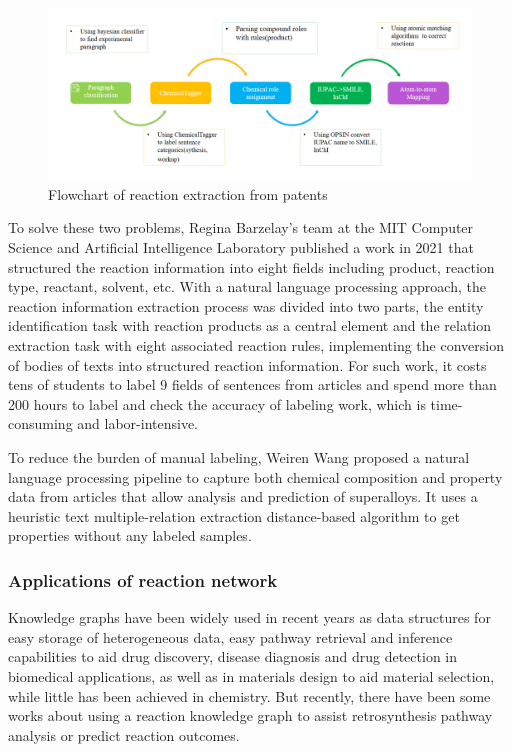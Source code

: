 \documentclass[%
 aip,
 jmp,%
 amsmath,amssymb,
 reprint,%
]{revtex4-2}
\begin{document}
\begin{figure}[htbp]
 \centering
 \includegraphics[width=1\textwidth]{figure/5.png}
 \caption{ Flowchart of reaction extraction from patents }
 \label{ Fig.5 }
\end{figure}

To solve these two problems, Regina Barzelay's team at the MIT Computer Science and Artificial Intelligence Laboratory published a work in 2021 that structured the reaction information into eight fields including product, reaction type, reactant, solvent, etc. With a natural language processing approach, the reaction information extraction process was divided into two parts, the entity identification task with reaction products as a central element and the relation extraction task with eight associated reaction rules, implementing the conversion of bodies of texts into structured reaction information\cite{guo2021automated}. For such work, it costs tens of students to label 9 fields of sentences from articles and spend more than 200 hours to label and check the accuracy of labeling work, which is time-consuming and labor-intensive.

To reduce the burden of manual labeling, Weiren Wang proposed a natural language processing pipeline to capture both chemical composition and property data from articles that allow analysis and prediction of superalloys. It uses a heuristic text multiple-relation extraction distance-based algorithm to get properties without any labeled samples\cite{wang2022automated}.

\subsubsection{Applications of reaction network}
Knowledge graphs have been widely used in recent years as data structures for easy storage of heterogeneous data, easy pathway retrieval and inference capabilities to aid drug discovery\cite{zeng2022toward}, disease diagnosis\cite{chai2020diagnosis} and drug detection in biomedical applications\cite{wang2021drug}, as well as in materials design to aid material selection\cite{nie2022automating}, while little has been achieved in chemistry. But recently, there have been some works about using a reaction knowledge graph to assist retrosynthesis pathway analysis\cite{jeong2022intelligent} or predict reaction outcomes\cite{nair2019data}.
\end{document}
